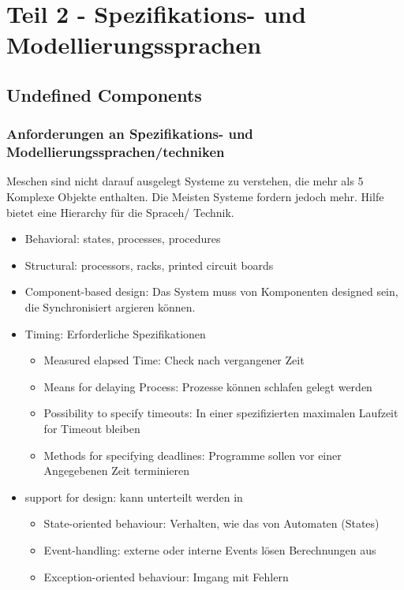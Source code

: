 \section{Teil 2 - Spezifikations- und Modellierungssprachen}

\subsection{Undefined Components}

\subsubsection{Anforderungen an Spezifikations- und Modellierungssprachen/techniken}

Meschen sind nicht darauf ausgelegt Systeme zu verstehen, die mehr als 5 Komplexe Objekte enthalten.
Die Meisten Systeme fordern jedoch mehr.
Hilfe bietet eine Hierarchy für die Spraceh/ Technik.
\begin{itemize}
    \item Behavioral: states, processes, procedures
    \item Structural: processors, racks, printed circuit boards
    \item Component-based design: Das System muss von Komponenten designed sein,
            die Synchronisiert argieren können.
    \item Timing: Erforderliche Spezifikationen \begin{itemize}
        \item Measured elapsed Time: Check nach vergangener Zeit
        \item Means for delaying Process: Prozesse können schlafen gelegt werden
        \item Possibility to specify timeouts: In einer spezifizierten maximalen Laufzeit for Timeout bleiben
        \item Methods for specifying deadlines: Programme sollen vor einer Angegebenen Zeit terminieren
    \end{itemize}
    \item support for design: kann unterteilt werden in \begin{itemize}
        \item State-oriented behaviour: Verhalten, wie das von Automaten (States)
        \item Event-handling: externe oder interne Events lösen Berechnungen aus
        \item Exception-oriented behaviour: Imgang mit Fehlern
    \end{itemize}
\end{itemize}


